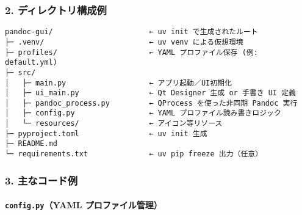 \subsubsection{2. ディレクトリ構成例}\label{ux30c7ux30a3ux30ecux30afux30c8ux30eaux69cbux6210ux4f8b}

\begin{verbatim}
pandoc-gui/                      ← uv init で生成されたルート
├─ .venv/                        ← uv venv による仮想環境
├─ profiles/                     ← YAML プロファイル保存 (例: default.yml)
├─ src/
│   ├─ main.py                   ← アプリ起動／UI初期化
│   ├─ ui_main.py                ← Qt Designer 生成 or 手書き UI 定義
│   ├─ pandoc_process.py         ← QProcess を使った非同期 Pandoc 実行
│   ├─ config.py                 ← YAML プロファイル読み書きロジック
│   └─ resources/                ← アイコン等リソース
├─ pyproject.toml                ← uv init 生成
├─ README.md
└─ requirements.txt              ← uv pip freeze 出力（任意）
\end{verbatim}

\subsubsection{3. 主なコード例}\label{ux4e3bux306aux30b3ux30fcux30c9ux4f8b}

\paragraph{\texorpdfstring{\texttt{config.py}（YAML プロファイル管理）}{config.py（YAML プロファイル管理）}}\label{config.pyyaml-ux30d7ux30edux30d5ux30a1ux30a4ux30ebux7ba1ux7406}

